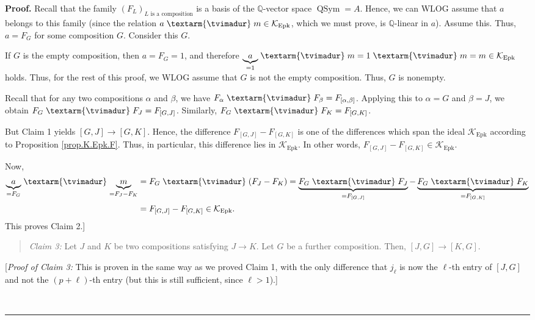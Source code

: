 \documentclass[numbers=enddot,12pt,final,onecolumn,notitlepage]{scrartcl}%
\theoremstyle{definition}
\newenvironment{statement}{\begin{quote}}{\end{quote}}
\newenvironment{proof}[1][Proof]{\noindent\textbf{#1.} }{\ \rule{0.5em}{0.5em}}
\newenvironment{verlong}{}{}
\newcommand{\tvi}{\left. \textarm{\tvimadur} \right.}
\begin{document}
\begin{verlong}
\begin{proof}
Recall that the family $\left(  F_{L}\right)  _{L\text{ is a composition}}$ is
a basis of the $\mathbb{Q}$-vector space $\operatorname*{QSym}=A$. Hence, we
can WLOG assume that $a$ belongs to this family (since the relation
$a\tvi  m\in\mathcal{K}_{\operatorname{Epk}}$, which we must prove, is
$\mathbb{Q}$-linear in $a$). Assume this. Thus, $a=F_{G}$ for some composition
$G$. Consider this $G$.

If $G$ is the empty composition, then $a=F_{G}=1$, and therefore
$\underbrace{a}_{=1}\tvi  m=1\tvi  m=m\in\mathcal{K}_{\operatorname{Epk}}$
holds. Thus, for the rest of this proof, we WLOG assume that $G$ is not the
empty composition. Thus, $G$ is nonempty.

Recall that for any two compositions $\alpha$ and $\beta$, we have $F_{\alpha
}\tvi  F_{\beta}=F_{\left[  \alpha,\beta\right]  }$. Applying this to
$\alpha=G$ and $\beta=J$, we obtain $F_{G}\tvi  F_{J}=F_{\left[  G,J\right]
}$. Similarly, $F_{G}\tvi  F_{K}=F_{\left[  G,K\right]  }$.

But Claim 1 yields $\left[  G,J\right]  \rightarrow\left[  G,K\right]  $.
Hence, the difference $F_{\left[  G,J\right]  }-F_{\left[  G,K\right]  }$ is
one of the differences which span the ideal $\mathcal{K}_{\operatorname{Epk}%
}$ according to Proposition \ref{prop.K.Epk.F}. Thus, in particular, this
difference lies in $\mathcal{K}_{\operatorname{Epk}}$. In other words,
$F_{\left[  G,J\right]  }-F_{\left[  G,K\right]  }\in\mathcal{K}%
_{\operatorname{Epk}}$.

Now,%
\begin{align*}
\underbrace{a}_{=F_{G}}\tvi \underbrace{m}_{=F_{J}-F_{K}}  &  =F_{G}%
\tvi \left(  F_{J}-F_{K}\right)  =\underbrace{F_{G}\tvi F_{J}}_{=F_{\left[
G,J\right]  }}-\underbrace{F_{G}\tvi F_{K}}_{=F_{\left[  G,K\right]  }}\\
&  =F_{\left[  G,J\right]  }-F_{\left[  G,K\right]  }\in\mathcal{K}%
_{\operatorname{Epk}}.
\end{align*}
This proves Claim 2.]

\begin{statement}
\textit{Claim 3:} Let $J$ and $K$ be two compositions satisfying $J\rightarrow
K$. Let $G$ be a further composition. Then, $\left[  J,G\right]
\rightarrow\left[  K,G\right]  $.
\end{statement}

[\textit{Proof of Claim 3:} This is proven in the same way as we proved Claim
1, with the only difference that $j_{\ell}$ is now the $\ell$-th entry of
$\left[  J,G\right]  $ and not the $\left(  p+\ell\right)  $-th entry (but
this is still sufficient, since $\ell>1$).]


\end{proof}
\end{verlong}
\end{document}
